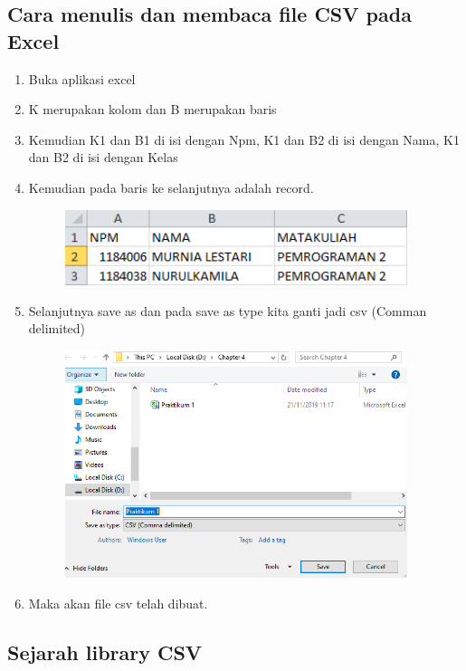\documentclass{article}
\begin{document}
    \subsection{Cara menulis dan membaca file CSV pada Excel}
        \begin{enumerate}
            \item Buka aplikasi excel
            \item K merupakan kolom dan B merupakan baris
            \item Kemudian K1 dan B1 di isi dengan Npm, K1 dan B2 di isi dengan Nama, K1 dan B2 di isi dengan Kelas
            \item Kemudian pada baris ke selanjutnya adalah record.
            \begin{figure}[ht]
                \centerline{\includegraphics[width=10cm]{figure/1.PNG}}
            \end{figure}
            \item Selanjutnya save as dan pada save as type kita ganti jadi csv (Comman delimited)
            \newpage
            \begin{figure}[ht]
                \centerline{\includegraphics[width=10cm]{figure/2.PNG}}
            \end{figure}
            \item Maka akan file csv telah dibuat.
        \end{enumerate}
    
    \subsection{Sejarah library CSV}
\end{document}
